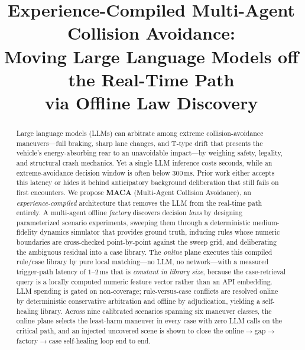 \documentclass[conference]{IEEEtran}
\begin{document}
\title{Experience-Compiled Multi-Agent Collision Avoidance:\\
Moving Large Language Models off the Real-Time Path\\
via Offline Law Discovery}

\author{
}

\maketitle

\begin{abstract}
Large language models (LLMs) can arbitrate among extreme collision-avoidance
maneuvers---full braking, sharp lane changes, and T-type drift that presents
the vehicle's energy-absorbing rear to an unavoidable impact---by weighing
safety, legality, and structural crash mechanics. Yet a single LLM inference
costs seconds, while an extreme-avoidance decision window is often below
$300$\,ms. Prior work either accepts this latency or hides it behind
anticipatory background deliberation that still fails on first encounters.
We propose \textbf{MACA} (Multi-Agent Collision Avoidance), an
\emph{experience-compiled} architecture that removes the LLM from the
real-time path entirely. A multi-agent offline \emph{factory} discovers
decision \emph{laws} by designing parameterized scenario experiments,
sweeping them through a deterministic medium-fidelity dynamics simulator that
provides ground truth, inducing rules whose numeric boundaries are
cross-checked point-by-point against the sweep grid, and deliberating the
ambiguous residual into a case library. The \emph{online} plane executes this
compiled rule/case library by pure local matching---no LLM, no network---with
a measured trigger-path latency of $1$--$2$\,ms that is \emph{constant in
library size}, because the case-retrieval query is a locally computed numeric
feature vector rather than an API embedding. LLM spending is gated on
non-coverage; rule-versus-case conflicts are resolved online by deterministic
conservative arbitration and offline by adjudication, yielding a self-healing
library. Across nine calibrated scenarios spanning six maneuver classes, the
online plane selects the least-harm maneuver in every case with zero LLM
calls on the critical path, and an injected uncovered scene is shown to
close the online$\to$gap$\to$factory$\to$case self-healing loop end to end.
\end{abstract}
\end{document}
